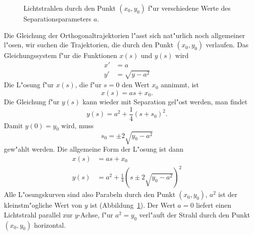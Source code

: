 \begin{diskussion}
\begin{figure}
\centering
{}
\caption{Lichtstrahlen durch den Punkt $(x_0,y_0)$ f"ur verschiedene
Werte des Separationsparameters $a$.
\label{40000008:fata}}
\end{figure}
Die Gleichung der Orthogonaltrajektorien l"asst sich nat"urlich noch
allgemeiner l"osen, wir suchen die Trajektorien, die durch den Punkt
$(x_0,y_0)$ verlaufen.
Das Gleichungssystem f"ur die Funktionen $x(s)$ und $y(s)$ wird
\begin{align*}
x'&=a\\
y'&=\sqrt{y-a^2}
\end{align*}
Die L"osung f"ur $x(s)$, die f"ur $s=0$ den Wert $x_0$ annimmt, ist
\[
x(s)=as+x_0.
\]
Die Gleichung f"ur $y(s)$ kann wieder mit Separation gel"ost werden,
man findet
\[
y(s)=a^2+\frac14(s+s_0)^2.
\]
Damit $y(0)=y_0$ wird, muss 
\[
s_0=\pm 2\sqrt{y_0-a^2}
\]
gew"ahlt werden.
Die allgemeine Form der L"osung ist dann
\begin{align*}
x(s)&=as+x_0
\\
y(s)&=a^2 + \frac14\left(s\pm2\sqrt{y_0-a^2}\right)^2
\end{align*}
Alle L"osungskurven sind also Parabeln durch den Punkt $(x_0,y_0)$,
$a^2$ ist der kleinstm"ogliche Wert von $y$ ist (Abbildung~\ref{40000008:fata}).
Der Wert $a=0$ liefert einen Lichtstrahl parallel zur $y$-Achse, f"ur $a^2=y_0$
verl"auft der Strahl durch den Punkt $(x_0,y_0)$ horizontal.
\end{diskussion}

